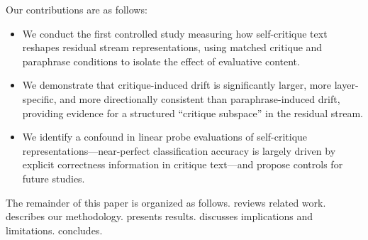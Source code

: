 Our contributions are as follows:
\begin{itemize}[leftmargin=*,itemsep=0pt,topsep=0pt]
    \item We conduct the first controlled study measuring how self-critique text reshapes residual stream representations, using matched critique and paraphrase conditions to isolate the effect of evaluative content.
    \item We demonstrate that critique-induced drift is significantly larger, more layer-specific, and more directionally consistent than paraphrase-induced drift, providing evidence for a structured ``critique subspace'' in the residual stream.
    \item We identify a confound in linear probe evaluations of self-critique representations---near-perfect classification accuracy is largely driven by explicit correctness information in critique text---and propose controls for future studies.
\end{itemize}

The remainder of this paper is organized as follows.  reviews related work.  describes our methodology.  presents results.  discusses implications and limitations.  concludes.
